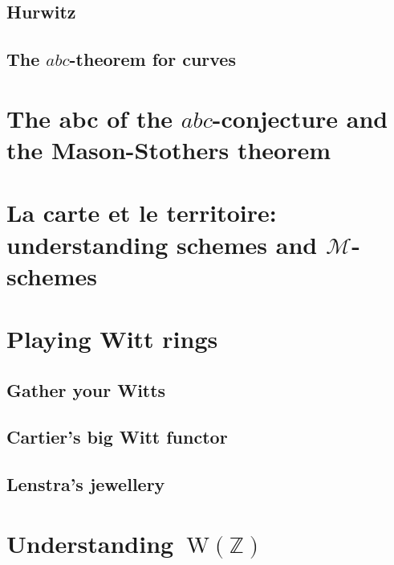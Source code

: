 \documentclass[a4paper]{memoir}
\begin{document}
\section{Hurwitz}
\section{The $abc$-theorem for curves}



\chapter{The abc of the $abc$-conjecture and the Mason-Stothers theorem}





\chapter{La carte et le territoire: understanding schemes and $\mathcal{M}$-schemes}








\chapter{Playing Witt rings}
\section{Gather your Witts}

\section{Cartier's big Witt functor}

\section{Lenstra's jewellery}



\chapter{Understanding~$\mathrm{W}(\mathbb{Z})$}




\end{document}
